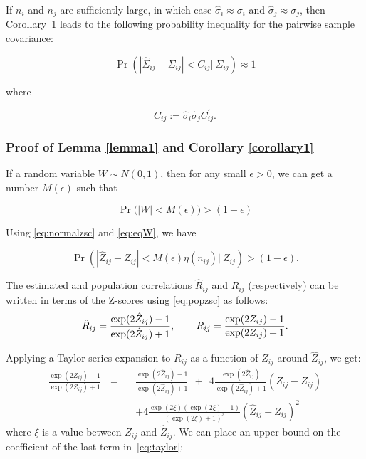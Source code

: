 If $n_i$ and $n_j$ are sufficiently large, in which case $\hat{\sigma}_{i} \approx \sigma_i$ and $\hat{\sigma}_{j} \approx \sigma_{j}$, then Corollary~1 leads to the following probability inequality for the pairwise sample covariance:

\begin{equation}\label{eq:boundcorollary1Sigma}
    \Pr \left (|\hat{\Sigma}_{ij} - \Sigma_{ij} | <  C_{ij} \bigg |~  \Sigma_{ij}  \right )  \approx 1 
\end{equation}

where 

\begin{equation}\label{eq:definec2}
    C_{ij}  := \hat{\sigma}_{i}\hat{\sigma}_{j} C^{'}_{ij}.
\end{equation}

\subsubsection*{Proof of Lemma \ref{lemma1} and Corollary \ref{corollary1}}

If a random variable $W \sim N \left ( 0, 1 \right) $, then for any small $\epsilon > 0$, we can get a number $M(\epsilon)$ such that 

\begin{equation}\label{eq:eqW}
    \Pr \big ( |W| < M(\epsilon) \big ) > (1 - \epsilon)
\end{equation}

Using \eqref{eq:normalzsc} and \eqref{eq:eqW}, we have 

\begin{equation}\label{eq:zM}
   \Pr \left ( |\hat{Z}_{ij} - Z_{ij} | < M(\epsilon) \eta(n_{ij}) \bigg |~Z_{ij} \right) > \left ( 1 - \epsilon \right).
\end{equation}

The estimated and population correlations $\hat{R}_{ij}$ and $R_{ij}$ (respectively) can be written in terms of the Z-scores using \eqref{eq:popzsc} as follows:
\begin{equation}\label{eq:Rbound}
    \hat{R}_{ij} =  \frac{\exp(2 \hat{Z}_{ij}) - 1 }{\exp(2 \hat{Z}_{ij}) + 1},~~ \hspace{0.5 cm} R_{ij} = \frac{\exp(2 Z_{ij}) - 1 }{\exp(2 Z_{ij}) + 1}.
\end{equation}

Applying a Taylor series expansion to $R_{ij}$ as a function of $Z_{ij}$ around $\hat{Z}_{ij}$, we get:
\begin{align}
    \frac{\exp(2 Z_{ij}) - 1 }{\exp(2 Z_{ij}) + 1}  ~~~=~~~&  \frac{\exp(2 \hat{Z}_{ij}) - 1 }{\exp(2 \hat{Z}_{ij}) + 1} ~~+~~ 4 \frac{\exp(2 \hat{Z}_{ij})}{\exp(2 \hat{Z}_{ij}) + 1} (\hat{Z}_{ij} - Z_{ij}) \nonumber \\
    & + 4 \frac{\exp(2\xi){\left (\exp(2\xi) - 1 \right )}}{\left (\exp(2\xi) + 1 \right )^3} (\hat{Z}_{ij} - Z_{ij})^2 \label{eq:taylor}
    \end{align}
where $\xi$ is a value between $Z_{ij}$ and $\hat{Z}_{ij}$. We can place an upper bound on the coefficient of the last term in~\eqref{eq:taylor}:


